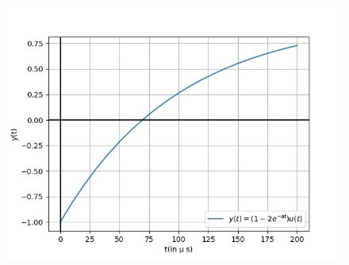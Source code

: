 \documentclass[journal,12pt,twocolumn]{IEEEtran}
\theoremstyle{remark}
\begin{document}
\begin{figure}[!h]
    \centering
    \includegraphics[width=\columnwidth]{2022/BM/38/figs/graph.png}
\end{figure}
\end{document}
